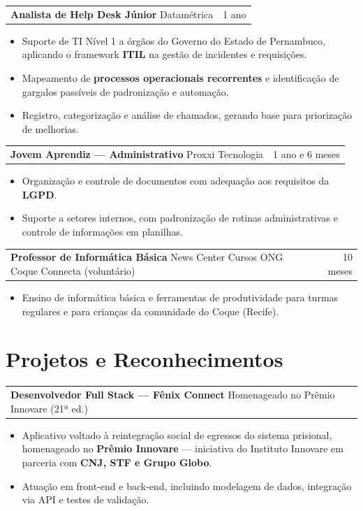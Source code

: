 \documentclass[a4paper,10.5pt]{article}
\makeatletter
\newcommand{\cargo}[3]{%
  \vspace{2pt}
  \begin{tabularx}{\textwidth}{@{}Xr@{}}
    \textbf{#1} \textnormal{\textbar{} #2} & \textcolor{muted}{#3}
  \end{tabularx}%
  \vspace{1pt}
}
\makeatother
\begin{document}
\cargo{Analista de Help Desk Júnior}{Datamétrica}{1 ano}
\begin{itemize}
  \item Suporte de TI Nível 1 a órgãos do Governo do Estado de Pernambuco, aplicando o framework \textbf{ITIL} na gestão de incidentes e requisições.
  \item Mapeamento de \textbf{processos operacionais recorrentes} e identificação de gargalos passíveis de padronização e automação.
  \item Registro, categorização e análise de chamados, gerando base para priorização de melhorias.
\end{itemize}

\cargo{Jovem Aprendiz --- Administrativo}{Proxxi Tecnologia}{1 ano e 6 meses}
\begin{itemize}
  \item Organização e controle de documentos com adequação aos requisitos da \textbf{LGPD}.
  \item Suporte a setores internos, com padronização de rotinas administrativas e controle de informações em planilhas.
\end{itemize}

\cargo{Professor de Informática Básica}{News Center Cursos \textbar{} ONG Coque Connecta (voluntário)}{10 meses}
\begin{itemize}
  \item Ensino de informática básica e ferramentas de produtividade para turmas regulares e para crianças da comunidade do Coque (Recife).
\end{itemize}

\vspace{-0.5em}
\section{Projetos e Reconhecimentos}

\cargo{Desenvolvedor Full Stack --- Fênix Connect}{Homenageado no Prêmio Innovare (21ª ed.)}{}
\begin{itemize}
  \item Aplicativo voltado à reintegração social de egressos do sistema prisional, homenageado no \textbf{Prêmio Innovare} --- iniciativa do Instituto Innovare em parceria com \textbf{CNJ, STF e Grupo Globo}.
  \item Atuação em front-end e back-end, incluindo modelagem de dados, integração via API e testes de validação.
\end{itemize}
\end{document}
